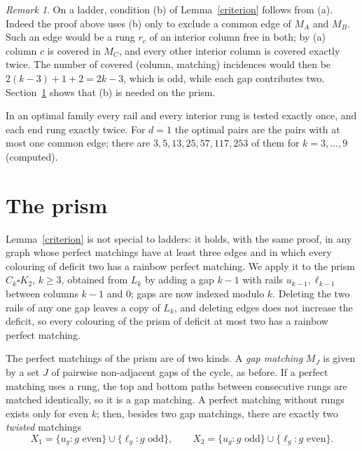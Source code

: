 \documentclass[11pt]{article}
\theoremstyle{remark}
\newtheorem*{remark}{Remark}
\begin{document}
\begin{remark}
On a ladder, condition (b) of Lemma~\ref{criterion} follows from (a). Indeed
the proof above uses (b) only to exclude a common edge of \(M_A\) and
\(M_B\). Such an edge would be a rung \(r_c\) of an interior column free in
both; by (a) column \(c\) is covered in \(M_C\), and every other interior
column is covered exactly twice. The number of covered (column, matching)
incidences would then be \(2(k-3)+1+2=2k-3\), which is odd, while each gap
contributes two. Section~\ref{prism} shows that (b) is needed on the prism.

In an optimal family every rail and every interior rung is tested exactly
once, and each end rung exactly twice. For \(d=1\) the optimal pairs are the
pairs with at most one common edge; there are \(3,5,13,25,57,117,253\) of
them for \(k=3,\dots,9\) (computed).
\end{remark}

\section{The prism}\label{prism}
Lemma~\ref{criterion} is not special to ladders: it holds, with the same
proof, in any graph whose perfect matchings have at least three edges and in
which every colouring of deficit two has a rainbow perfect matching. We apply
it to the prism \(C_k\square K_2\), \(k\ge3\), obtained from \(L_k\) by adding
a gap \(k-1\) with rails \(u_{k-1},\ell_{k-1}\) between columns \(k-1\) and
\(0\); gaps are now indexed modulo \(k\). Deleting the two rails of any one
gap leaves a copy of \(L_k\), and deleting edges does not increase the
deficit, so every colouring of the prism of deficit at most two has a rainbow
perfect matching.

The perfect matchings of the prism are of two kinds. A \emph{gap matching}
\(M_J\) is given by a set \(J\) of pairwise non-adjacent gaps of the cycle,
as before. If a perfect matching uses a rung, the top and bottom paths
between consecutive rungs are matched identically, so it is a gap matching.
A perfect matching without rungs exists only for even \(k\); then, besides
two gap matchings, there are exactly two \emph{twisted} matchings
\[
X_1=\{u_g: g\text{ even}\}\cup\{\ell_g: g\text{ odd}\},\qquad
X_2=\{u_g: g\text{ odd}\}\cup\{\ell_g: g\text{ even}\}.
\]
\end{document}
